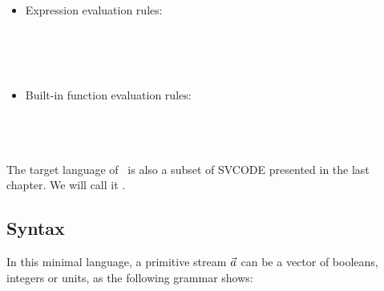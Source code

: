 
\begin{itemize}
\item Expression evaluation rules:
	
	\\[2ex]	
	\\[2ex]
	
	\\[2ex]
	
\item Built-in function evaluation rules:

	
	 \\[2ex]
	
	
\end{itemize}


\section{\fmsvcode}
The target language of \fmsnesl \  is also a subset of SVCODE presented in the last chapter. 
We will call it  \fmsvcode.

\subsection{Syntax}
In this minimal language, a primitive stream $\vec a$ can be a vector of booleans, integers or units, as the following grammar shows:

